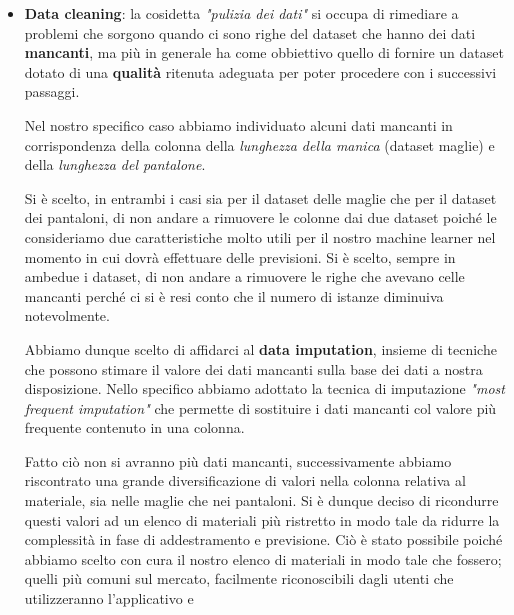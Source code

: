 \documentclass[a4paper, 11pt, oneside]{report}
\begin{document}
                \begin{itemize}
                    \item \textbf{Data cleaning}: la cosidetta \textit{"pulizia dei dati"} si occupa di
                    rimediare a problemi che sorgono quando ci sono righe del dataset che hanno dei dati \textbf{mancanti}, ma più
                    in generale ha come obbiettivo quello di fornire un dataset dotato di una \textbf{qualità} ritenuta adeguata
                    per poter procedere con i successivi passaggi.
                    \par \noindent Nel nostro specifico caso abbiamo individuato alcuni dati mancanti in corrispondenza della
                    colonna della \textit{lunghezza della manica} (dataset maglie) e della \textit{lunghezza del pantalone}.
                    \par \noindent Si è scelto, in entrambi i casi sia per il dataset delle maglie che per il dataset
                    dei pantaloni, di non andare a rimuovere le colonne dai due dataset poiché le consideriamo due caratteristiche
                    molto utili per il nostro machine learner nel momento in cui dovrà effettuare delle previsioni.
                    Si è scelto, sempre in ambedue i dataset, di non andare a rimuovere le righe che avevano celle mancanti
                    perché ci si è resi conto che il numero di istanze diminuiva notevolmente.
                    \par \noindent Abbiamo dunque scelto di affidarci al \textbf{data imputation}, insieme di tecniche che
                    possono stimare il valore dei dati mancanti sulla base dei dati a nostra disposizione.
                    Nello specifico abbiamo adottato la tecnica di imputazione \textit{"most frequent imputation"} che permette
                    di sostituire i dati mancanti col valore più frequente contenuto in una colonna.
                    \par \noindent Fatto ciò non si avranno più dati mancanti, successivamente abbiamo riscontrato una grande
                    diversificazione di valori nella colonna relativa al materiale, sia nelle maglie che nei pantaloni.
                    Si è dunque deciso di ricondurre questi valori ad un elenco di materiali più ristretto in modo tale da ridurre
                    la complessità in fase di addestramento e previsione.
                    Ciò è stato possibile poiché abbiamo scelto con cura il nostro elenco di materiali in modo tale che fossero;
                    quelli più comuni sul mercato, facilmente riconoscibili dagli utenti che utilizzeranno l'applicativo e

\end{itemize}
\end{document}
